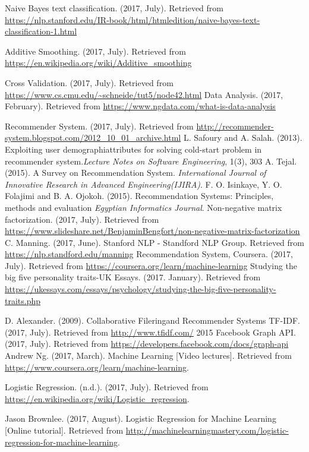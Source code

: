 \begin{thebibliography}{9}
	Naive Bayes text classification. (2017, July). Retrieved from \url{https://nlp.stanford.edu/IR-book/html/htmledition/naive-bayes-text-classification-1.html}

	Additive Smoothing. (2017, July). Retrieved from \url{https://en.wikipedia.org/wiki/Additive_smoothing}

Cross Validation. (2017, July). Retrieved from \url{https://www.cs.cmu.edu/~schneide/tut5/node42.html}
Data Analysis. (2017, February). Retrieved from \url{https://www.ngdata.com/what-is-data-analysis}

 Recommender System. (2017, July). Retrieved from \url{http://recommender-system.blogspot.com/2012_10_01_archive.html}
	 L. Safoury and A. Salah. (2013). Exploiting user demographiattributes for solving cold-start problem in recommender system.\textit{Lecture Notes on Software Engineering}, 1(3), 303
	A. Tejal. (2015). A Survey on Recommendation System. \textit{International Journal of Innovative Research in Advanced Engineering(IJIRA)}.
	F. O. Isinkaye, Y. O. Folajimi and B. A. Ojokoh. (2015). Recommendation Systems: Principles, methods and evaluation \textit{Egyptian Informatics Journal}.
	Non-negative matrix factorization. (2017, July). Retrieved from \url{https://www.slideshare.net/BenjaminBengfort/non-negative-matrix-factorization}
C. Manning. (2017, June). Stanford NLP - Standford NLP Group. Retrieved from \url{https://nlp.standford.edu/manning}
	Recommendation System, Coursera. (2017, July). Retrieved from \url{https://coursera.org/learn/machine-learning}
Studying the big five personality traits-UK Essays. (2017. January). Retrieved from \url{https://ukessays.com/essays/psychology/studying-the-big-five-personality-traits.php}

D. Alexander. (2009). Collaborative Fileringand Recommender Systems
TF-IDF. (2017, July). Retrieved from \url{http://www.tfidf.com/} 2015
Facebook Graph API. (2017, July). Retrieved from \url{https://developers.facebook.com/docs/graph-api}
  Andrew Ng. (2017, March). Machine Learning [Video lectures]. Retrieved from \url{https://www.coursera.org/learn/machine-learning}.

  Logistic Regression. (n.d.). (2017, July). Retrieved from
  \url{https://en.wikipedia.org/wiki/Logistic_regression}.

  Jason Brownlee. (2017, August). Logistic Regression for Machine Learning [Online tutorial].
  Retrieved from
  \url{http://machinelearningmastery.com/logistic-regression-for-machine-learning}.

\end{thebibliography}
